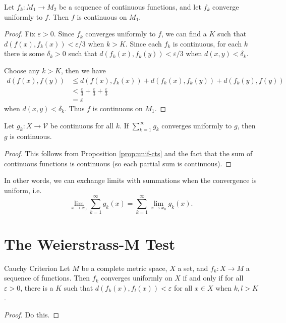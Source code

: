 \documentclass[10pt]{report}
\begin{document}
\begin{prop}
	\label{prop:unif-cts}
	Let $f_k: M_1 \to M_2$ be a sequence of continuous functions, and let $f_k$ converge uniformly to $f$. Then $f$ is continuous on $M_1$.
\end{prop}
\begin{proof}
	Fix $\varepsilon>0$. Since $f_k$ converges uniformly to $f$, we can find a $K$ such that $d(f(x), f_k(x)) < \varepsilon/3$ when $k > K$. Since each $f_k$ is continuous, for each $k$ there is some $\delta_k > 0$ such that $d(f_k(x), f_k(y)) < \varepsilon/3$ when $d(x,y) < \delta_k$.

	Choose any $k > K$, then we have
	\begin{align*}
		d(f(x), f(y)) &\leq d(f(x), f_k(x)) + d(f_k(x), f_k(y)) + d(f_k(y), f(y)) \\
			      &< \frac{\varepsilon}{3} + \frac{\varepsilon}{3} + \frac{\varepsilon}{3} \\
			      &= \varepsilon
	\end{align*}
	when $d(x,y) < \delta_k$. Thus $f$ is continuous on $M_1$.
\end{proof}

\begin{cor}
	Let $g_k: X \to \mathcal{V}$ be continuous for all $k$. If $\sum_{k=1}^{\infty} g_k$ converges uniformly to $g$, then $g$ is continuous.
\end{cor}
\begin{proof}
	This follows from Proposition \ref{prop:unif-cts} and the fact that the sum of continuous functions is continuous (so each partial sum is continuous).
\end{proof}

\begin{note}{}{}
In other words, we can exchange limits with summations when the convergence is uniform, i.e.
\[
	\lim_{x \to x_0} \sum_{k=1}^{\infty} g_k(x) = \sum_{k=1}^{\infty} \lim_{x \to x_0} g_k(x).
\] 
\end{note}



\section{The Weierstrass-M Test}

\begin{thrm}{Cauchy Criterion}{}
	Let $M$ be a complete metric space, $X$ a set, and $f_k: X \to M$ a sequence of functions. Then $f_k$ converges uniformly on $X$ if and only if for all $\varepsilon > 0$, there is a $K$ such that $d(f_k(x), f_l(x)) < \varepsilon$ for all $x \in X$ when $k,l > K$.
\end{thrm}
\begin{proof}
	{\color{red}Do this.}
\end{proof}
\end{document}
